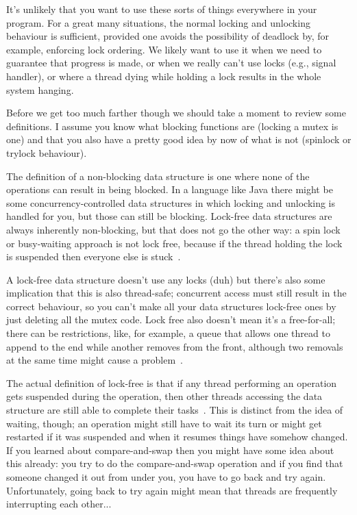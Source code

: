 It's unlikely that you want to use these sorts of things everywhere in your program. For a great many situations, the normal locking and unlocking behaviour is sufficient, provided one avoids the possibility of deadlock by, for example, enforcing lock ordering. We likely want to use it when we need to guarantee that progress is made, or when we really can't use locks (e.g., signal handler), or where a thread dying while holding a lock results in the whole system hanging.

Before we get too much farther though we should take a moment to review some definitions. I assume you know what blocking functions are (locking a mutex is one) and that you also have a pretty good idea by now of what is not (spinlock or trylock behaviour). 

The definition of a non-blocking data structure is one where none of the operations can result in being blocked. In a language like Java there might be some concurrency-controlled data structures in which locking and unlocking is handled for you, but those can still be blocking. Lock-free data structures are always inherently non-blocking, but that does not go the other way: a spin lock or busy-waiting approach is not lock free, because if the thread holding the lock is suspended then everyone else is stuck~\cite{nblfwf}.

A lock-free data structure doesn't use any locks (duh) but there's also some implication that this is also thread-safe; concurrent access must still result in the correct behaviour, so you can't make all your data structures lock-free ones by just deleting all the mutex code. Lock free also doesn't mean it's a free-for-all; there can be restrictions, like, for example, a queue that allows one thread to append to the end while another removes from the front, although two removals at the same time might cause a problem~\cite{nblfwf}.

The actual definition of lock-free is that if any thread performing an operation gets suspended during the operation, then other threads accessing the data structure are still able to complete their tasks~\cite{nblfwf}. This is distinct from the idea of waiting, though; an operation might still have to wait its turn or might get restarted if it was suspended and when it resumes things have somehow changed. If you learned about compare-and-swap then you might have some idea about this already: you try to do the compare-and-swap operation and if you find that someone changed it out from under you, you have to go back and try again. Unfortunately, going back to try again might mean that threads are frequently interrupting each other...

